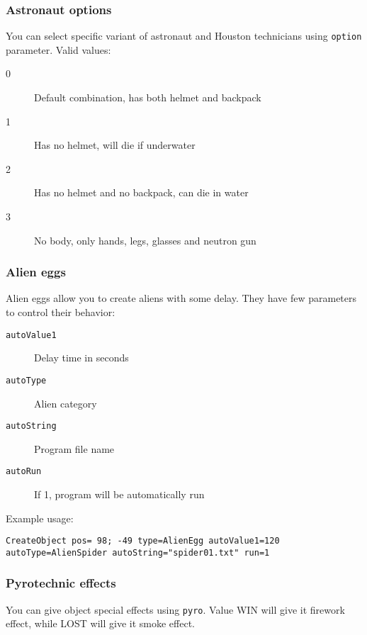 \subsubsection{Astronaut options}

You can select specific variant of astronaut and Houston technicians using \texttt{option} parameter. Valid values:

\begin{description}
    \item[0] Default combination, has both helmet and backpack
    \item[1] Has no helmet, will die if underwater
    \item[2] Has no helmet and no backpack, can die in water
    \item[3] No body, only hands, legs, glasses and neutron gun
\end{description}


\subsubsection{Alien eggs}

Alien eggs allow you to create aliens with some delay. They have few parameters to control their behavior:

\begin{description}
    \item[\texttt{autoValue1}] Delay time in seconds
    \item[\texttt{autoType}] Alien category
    \item[\texttt{autoString}] Program file name
    \item[\texttt{autoRun}] If 1, program will be automatically run
\end{description}

Example usage:

\begin{verbatim}
CreateObject pos= 98; -49 type=AlienEgg autoValue1=120 autoType=AlienSpider autoString="spider01.txt" run=1
\end{verbatim}


\subsubsection{Pyrotechnic effects}

You can give object special effects using \texttt{pyro}. Value WIN will give it firework effect, while LOST will give it smoke effect.

